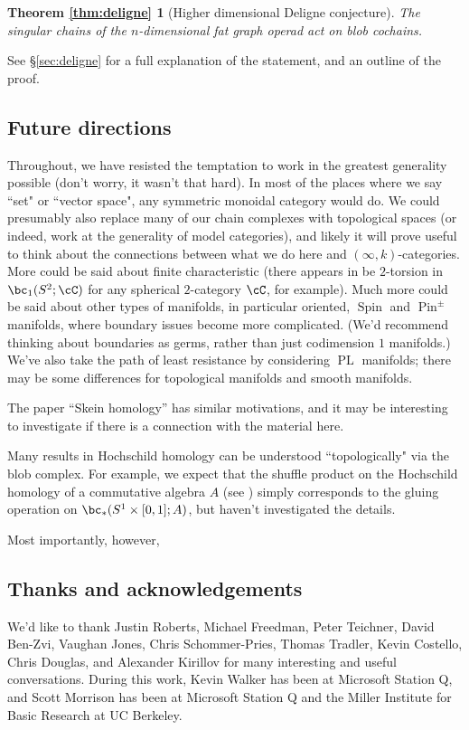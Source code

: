 \newtheorem*{thm:deligne}{Theorem \ref{thm:deligne}}

\begin{thm:deligne}[Higher dimensional Deligne conjecture]
The singular chains of the $n$-dimensional fat graph operad act on blob cochains.
\end{thm:deligne}
See \S \ref{sec:deligne} for a full explanation of the statement, and an outline of the proof.




\subsection{Future directions}
\label{sec:future}
Throughout, we have resisted the temptation to work in the greatest generality possible (don't worry, it wasn't that hard). 
In most of the places where we say ``set" or ``vector space", any symmetric monoidal category would do.
We could presumably also replace many of our chain complexes with topological spaces (or indeed, work at the generality of model categories), 
and likely it will prove useful to think about the connections between what we do here and $(\infty,k)$-categories.
More could be said about finite characteristic 
(there appears in be $2$-torsion in $\bc_1(S^2; \cC)$ for any spherical $2$-category $\cC$, for example).
Much more could be said about other types of manifolds, in particular oriented, 
$\operatorname{Spin}$ and $\operatorname{Pin}^{\pm}$ manifolds, where boundary issues become more complicated.
(We'd recommend thinking about boundaries as germs, rather than just codimension $1$ manifolds.) 
We've also take the path of least resistance by considering $\operatorname{PL}$ manifolds; 
there may be some differences for topological manifolds and smooth manifolds.

The paper ``Skein homology'' \cite{MR1624157} has similar motivations, and it may be 
interesting to investigate if there is a connection with the material here.

Many results in Hochschild homology can be understood ``topologically" via the blob complex.
For example, we expect that the shuffle product on the Hochschild homology of a commutative algebra $A$ 
(see \cite[\S 4.2]{MR1600246}) simply corresponds to the gluing operation on $\bc_*(S^1 \times [0,1]; A)$, 
but haven't investigated the details.

Most importantly, however,    


\subsection{Thanks and acknowledgements}
We'd like to thank 
Justin Roberts, 
Michael Freedman, 
Peter Teichner, 
David Ben-Zvi, 
Vaughan Jones, 
Chris Schommer-Pries, 
Thomas Tradler,
Kevin Costello, 
Chris Douglas,
and
Alexander Kirillov
for many interesting and useful conversations. 
During this work, Kevin Walker has been at Microsoft Station Q, and Scott Morrison has been at Microsoft Station Q and the Miller Institute for Basic Research at UC Berkeley.

